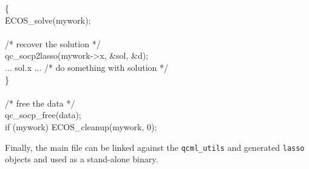 \documentclass[11pt]{article}
\begin{document}
{\begin{tabbing}
\> \{\\
\> \quad \= ECOS\_solve(mywork);\\
\\
\> \> /* recover the solution */ \\
\> \> qc\_socp2lasso(mywork->x, \&sol, \&d);\\
\> \> ... sol.x ... /* do something with solution */\\
\> \}\\
\\
\> /* free the data */ \\
\> qc\_socp\_free(data);\\
\> if (mywork) ECOS\_cleanup(mywork, 0);
\end{tabbing}  
}

Finally, the main file can be linked against the {\tt qcml\_utils} and
generated {\tt lasso} objects and used as a stand-alone binary.




\end{document}
